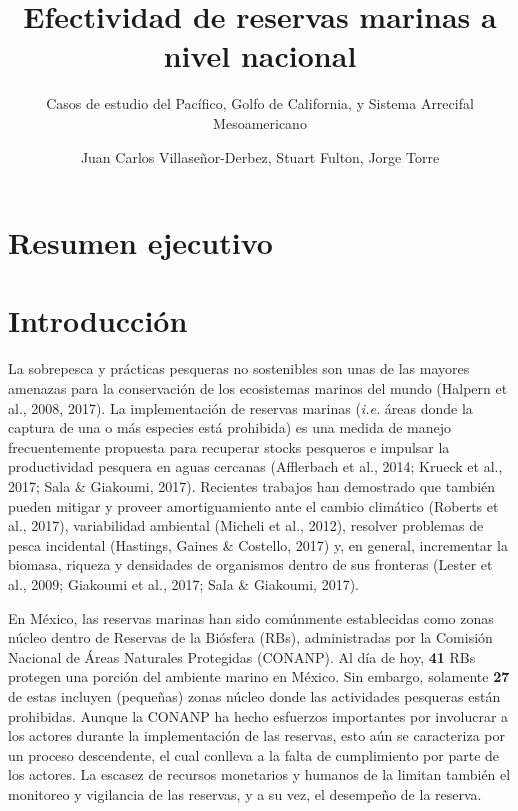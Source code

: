 \documentclass[12pt,]{article}
\title{Efectividad de reservas marinas a nivel nacional}
\subtitle{Casos de estudio del Pacífico, Golfo de California, y Sistema Arrecifal
Mesoamericano}
\author{Juan Carlos Villaseñor-Derbez, Stuart Fulton, Jorge Torre}
\date{}
\begin{document}
\maketitle

{
\setcounter{tocdepth}{4}
\tableofcontents
}
\section{Resumen ejecutivo}\label{resumen-ejecutivo}

\clearpage

\section{Introducción}\label{introduccion}

La sobrepesca y prácticas pesqueras no sostenibles son unas de las
mayores amenazas para la conservación de los ecosistemas marinos del
mundo (Halpern et al., 2008, 2017). La implementación de reservas
marinas (\emph{i.e.} áreas donde la captura de una o más especies está
prohibida) es una medida de manejo frecuentemente propuesta para
recuperar stocks pesqueros e impulsar la productividad pesquera en aguas
cercanas (Afflerbach et al., 2014; Krueck et al., 2017; Sala \&
Giakoumi, 2017). Recientes trabajos han demostrado que también pueden
mitigar y proveer amortiguamiento ante el cambio climático (Roberts et
al., 2017), variabilidad ambiental (Micheli et al., 2012), resolver
problemas de pesca incidental (Hastings, Gaines \& Costello, 2017) y, en
general, incrementar la biomasa, riqueza y densidades de organismos
dentro de sus fronteras (Lester et al., 2009; Giakoumi et al., 2017;
Sala \& Giakoumi, 2017).

En México, las reservas marinas han sido comúnmente establecidas como
zonas núcleo dentro de Reservas de la Biósfera (RBs), administradas por
la Comisión Nacional de Áreas Naturales Protegidas (CONANP). Al día de
hoy, \textbf{41} RBs protegen una porción del ambiente marino en México.
Sin embargo, solamente \textbf{27} de estas incluyen (pequeñas) zonas
núcleo donde las actividades pesqueras están prohibidas. Aunque la
CONANP ha hecho esfuerzos importantes por involucrar a los actores
durante la implementación de las reservas, esto aún se caracteriza por
un proceso descendente, el cual conlleva a la falta de cumplimiento por
parte de los actores. La escasez de recursos monetarios y humanos de la
limitan también el monitoreo y vigilancia de las reservas, y a su vez,
el desempeño de la reserva.
\end{document}
